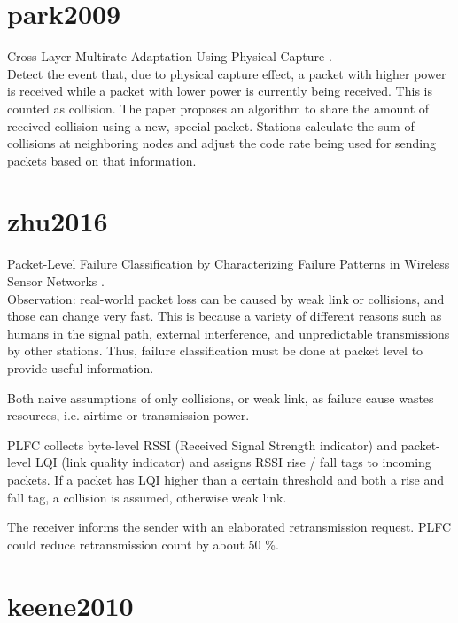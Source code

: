 \section*{park2009}

Cross Layer Multirate Adaptation Using Physical Capture \cite{park2009}.\\

Detect the event that, due to physical capture effect, a packet with higher power is received while a packet with lower power is currently being received. This is counted as collision. The paper proposes an algorithm to share the amount of received collision using a new, special packet. Stations calculate the sum of collisions at neighboring nodes and adjust the code rate being used for sending packets based on that information.



\section*{zhu2016}

Packet-Level Failure Classification by Characterizing Failure Patterns in Wireless Sensor Networks \cite{zhu2016}.\\

Observation: real-world packet loss can be caused by weak link or collisions, and those can change very fast. This is because a variety of different reasons such as humans in the signal path, external interference, and unpredictable transmissions by other stations. Thus, failure classification must be done at packet level to provide useful information.

Both naive assumptions of only collisions, or weak link, as failure cause wastes resources, i.e. airtime or transmission power.

PLFC collects byte-level RSSI (Received Signal Strength indicator) and packet-level LQI (link quality indicator) and assigns RSSI rise / fall tags to incoming packets. If a packet has LQI higher than a certain threshold and both a rise and fall tag, a collision is assumed, otherwise weak link.

The receiver informs the sender with an elaborated retransmission request. PLFC could reduce retransmission count by about 50 \%.



\section*{keene2010}

